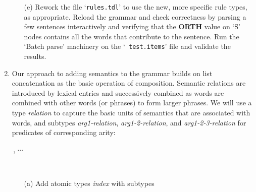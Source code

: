 \documentclass[10pt]{article}
\newcommand{\att}[1]{{\mbox{\scriptsize {\bf #1}}}}
\begin{document}
\begin{enumerate}
\begin{itemize}
          \item [(e)]
                Rework the file `{\tt rules.tdl}' to use the new, more
                specific rule types, as appropriate.
                Reload the grammar and check correctness by parsing a
                few sentences interactively and verifying that the
                \att{ORTH} value on `S' nodes contains all the words
                that contribute to the sentence.
                Run the `Batch parse' machinery on the `{\tt
                test.items}' file and validate the results.
        \end{itemize}
  \item Our approach to adding semantics to the grammar builds on list
        concatenation as the basic operation of composition.  Semantic
        relations are introduced by lexical entries and successively
        combined as words are combined with other words (or phrases) to
        form larger phrases.
        We will use a type {\it relation} to capture the basic
        units of semantics that are associated with words, and subtypes
        {\it arg1-relation}, {\it arg1-2-relation}, and
        {\it arg1-2-3-relation} for predicates of corresponding arity:\\
        \centerline{
        $\,$,
        \hspace{2ex}
        $\cdots$%
        \hspace{2ex}}\\
        \begin{itemize}
          \item [(a)]
                Add atomic types {\it index} with subtypes

\end{itemize}
\end{enumerate}
\end{document}
